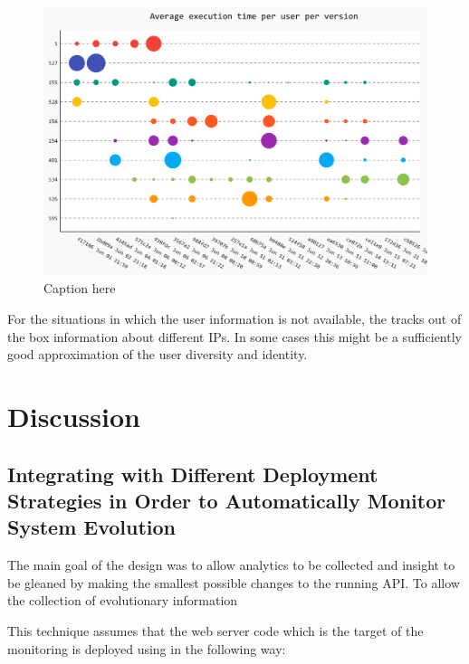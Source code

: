 \documentclass[conference]{IEEEtran}
\begin{document}
  \begin{figure}[!ht]
    \centering
    \includegraphics[width=\linewidth]{time_per_user_per_version}
    \caption{Caption here}
    \label{fig:tuv}
  \end{figure}

  For the situations in which the user information is not available, the \tool tracks out of the box information about different IPs. In some cases this might be a sufficiently good approximation of the user diversity and identity.

\section{Discussion}

  \subsection{Integrating with Different Deployment Strategies in Order to Automatically Monitor System Evolution}

  The main goal of the \tool design was to allow analytics to be collected and insight to be gleaned by making the smallest possible changes to the running API. To allow the collection of evolutionary information 

  This technique assumes that the web server code which is the target of the monitoring is deployed using \git in the following way: 
\end{document}
